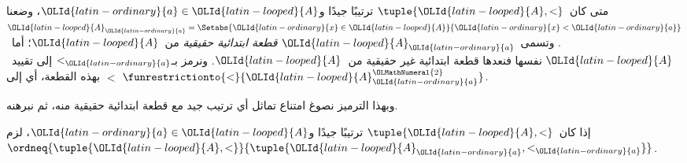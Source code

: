 \documentclass[../../../include/open-logic-section]{subfiles}
\begin{document}
\begin{defn}
متى كان~$\tuple{{\OLId{latin-looped}{A}}, <}$ ترتيبًا جيدًا و${\OLId{latin-ordinary}{a}} \in {\OLId{latin-looped}{A}}$، وضعنا
${\OLId{latin-looped}{A}}_{\OLId{latin-ordinary}{a}} = \Setabs{{\OLId{latin-ordinary}{x}} \in {\OLId{latin-looped}{A}}}{{\OLId{latin-ordinary}{x}} < {\OLId{latin-ordinary}{a}}}$. وتسمى~${\OLId{latin-looped}{A}}_{\OLId{latin-ordinary}{a}}$ \emph{قطعة ابتدائية
حقيقية} من~${\OLId{latin-looped}{A}}$؛ أما~${\OLId{latin-looped}{A}}$ نفسها فنعدها قطعة ابتدائية غير حقيقية من~${\OLId{latin-looped}{A}}$.
ونرمز بـ$<_{\OLId{latin-ordinary}{a}}$ إلى تقييد~$<$ بهذه القطعة، أي إلى
$\funrestrictionto{\mathord{<}}{{\OLId{latin-looped}{A}}_{\OLId{latin-ordinary}{a}}^{\OLMathNumeral{2}}}$.
\end{defn}
\noindent
وبهذا الترميز نصوغ امتناع تماثل أي ترتيب جيد مع قطعة ابتدائية حقيقية
منه، ثم نبرهنه.

\begin{lem}
إذا كان~$\tuple{{\OLId{latin-looped}{A}}, <}$ ترتيبًا جيدًا و${\OLId{latin-ordinary}{a}} \in {\OLId{latin-looped}{A}}$، لزم
$\ordneq{\tuple{{\OLId{latin-looped}{A}}, <}}{\tuple{{\OLId{latin-looped}{A}}_{\OLId{latin-ordinary}{a}}, <_{\OLId{latin-ordinary}{a}}}}$.
\end{lem}
\end{document}
